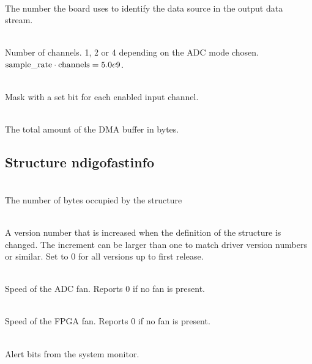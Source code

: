             \\
            The number the board uses to identify the data source in the output data stream.\par

            \\
            Number of channels. 1, 2 or 4 depending on the ADC mode chosen. $\text{sample\textunderscore rate}\cdot\text{channels} = 5.0e9$.\par

            \\
            Mask with a set bit for each enabled input channel.\par

            \\
            The total amount of the DMA buffer in bytes.\par


        \subsection{Structure ndigo\tu fast\tu info}

            \\
            The number of bytes occupied by the structure\par

            \\
            A version number that is increased when the definition of the structure is changed. The increment can be larger than one to match driver version numbers or similar. Set to 0 for all versions up to first release.\par

            \\
            Speed of the ADC fan. Reports 0 if no fan is present.\par

            \\
            Speed of the FPGA fan. Reports 0 if no fan is present.\par

            \\
            Alert bits from the system monitor.\par

